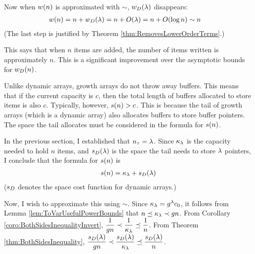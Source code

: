 Now when $w(n)$ is approximated with $\sim$, $w_D(\lambda)$ disappears:
\begin{align*}
w(n) &= n + w_D(\lambda) = n + O(\lambda) = n + O(\log n) \sim n
\end{align*}
(The last step is justified by Theorem \ref{thm:RemovesLowerOrderTerms}.)

This says that when $n$ items are added, the number of items written is approximately $n$. This is a significant improvement over the asymptotic bounds for $w_D(n)$.

\HdrSpaceComplex

Unlike dynamic arrays, growth arrays do not throw away buffers. This means that if the current capacity is $c$, then the total length of buffers allocated to store items is also $c$. Typically, however, $s(n) > c$. This is because the tail of growth arrays (which is a dynamic array) also allocates buffers to store buffer pointers. The space the tail allocates must be considered in the formula for $s(n)$.

In the previous section, I established that $n_\tau = \lambda$. Since $\kappa_\lambda$ is the capacity needed to hold $n$ items, and $s_D(\lambda)$ is the space the tail needs to store $\lambda$ pointers, I conclude that the formula for $s(n)$ is
\begin{align*}
s(n) = \kappa_\lambda + s_D(\lambda)
\end{align*}
($s_D$ denotes the space cost function for dynamic arrays.)

Now, I wish to approximate this using $\sim$. Since $\kappa_\lambda = g^\lambda c_0$, it follows from Lemma \ref{lem:ToVarUsefulPowerBounds} that $n \preceq \kappa_\lambda \prec g{n}$. From Corollary \ref{coro:BothSidesInequalityInvert}, $\dfrac{1}{g n} \prec \dfrac{1}{\kappa_\lambda} \preceq \dfrac{1}{n}$. From Theorem \ref{thm:BothSidesInequality}, $\dfrac{s_D(\lambda)}{g n} \prec \dfrac{s_D(\lambda)}{\kappa_\lambda} \preceq \dfrac{s_D(\lambda)}{n}$.


